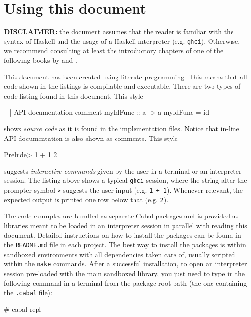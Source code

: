 \section{Using this document}
\label{sec:using-this-document}

\textbf{DISCLAIMER:} the document assumes that the reader is familiar with the syntax of Haskell and the usage of a Haskell interpreter (e.g. \texttt{ghci}). Otherwise, we recommend consulting at least the introductory chapters of one of the following books by \cite{Lipovaca11} and \cite{Hutton07}.

This document has been created using literate programming. This means that all code shown in the listings is compilable and executable. There are two types of code listing found in this document. This style
\begin{code}
-- | API documentation comment 
myIdFunc :: a -> a
myIdFunc = id
\end{code}
shows \emph{source code} as it is found in the implementation files. Notice that in-line API documentation is also shown as comments. This style
\begin{interactive}
Prelude> 1 + 1
2
\end{interactive}
suggests \emph{interactive commands} given by the user in a terminal or an interpreter session. The listing above shows a typical \texttt{ghci} session, where the string after the prompter symbol \texttt{>} suggests the user input (e.g. \texttt{1 + 1}). Whenever relevant, the expected output is printed one row below that (e.g. \texttt{2}).

The code examples are bundled as separate \href{https://www.haskell.org/cabal/}{Cabal} packages and is provided as libraries meant to be loaded in an interpreter session in parallel with reading this document. Detailed instructions on how to install the packages can be found in the \texttt{README.md} file in each project. The best way to install the packages is within sandboxed environments with all dependencies taken care of, usually scripted within the \texttt{make} commands. After a successful installation, to open an interpreter session pre-loaded with the main sandboxed library, you just need to type in the following command in a terminal from the package root path (the one containing the \texttt{.cabal} file):
\begin{interactive}
# cabal repl
\end{interactive}

